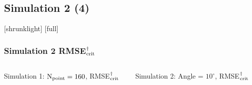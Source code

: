 \documentclass[12pt,compress,aspectratio=169]{beamer} %
\begin{document}
\subsection{Simulation 2 (4)}
[shrunklight]
[full]
\begin{frame}[t]
	\frametitle{Simulation 2 RMSE$^{\dagger}_{\operatorname{crit}}$}
	\centering
	\begin{columns}
	\begin{column}{0.5\textwidth}
	\centering
	\hspace*{-0.4cm}
	Simulation 1: $\operatorname{N}_{\operatorname{point}} = 160$, RMSE$^{\dagger}_{\operatorname{crit}}$\\
	\end{column}
	
	\begin{column}{0.5\textwidth}
	\centering
	Simulation 2: Angle = $10^{\circ}$, RMSE$^{\dagger}_{\operatorname{crit}}$\\
	\end{column}	
	\end{columns}
\end{frame}


\backupend
\end{document}

